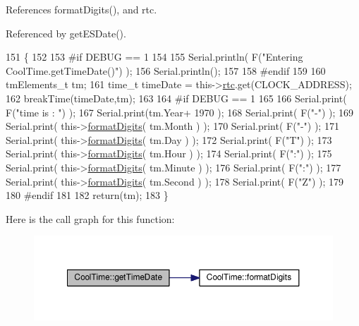 References format\+Digits(), and rtc.



Referenced by get\+E\+S\+Date().


\begin{DoxyCode}
151 \{
152 
153 \textcolor{preprocessor}{#if DEBUG == 1 }
154     
155     Serial.println( F(\textcolor{stringliteral}{"Entering CoolTime.getTimeDate()"}) );
156     Serial.println();
157 
158 \textcolor{preprocessor}{#endif}
159 
160     tmElements\_t tm;
161     time\_t timeDate = this->\hyperlink{classCoolTime_abd38f2384ff90692b1568d9db869412e}{rtc}.get(CLOCK\_ADDRESS);
162     breakTime(timeDate,tm);
163 
164 \textcolor{preprocessor}{#if DEBUG == 1}
165     
166     Serial.print( F(\textcolor{stringliteral}{"time is : "}) );
167     Serial.print(tm.Year+ 1970 );
168     Serial.print( F(\textcolor{stringliteral}{"-"}) );
169     Serial.print( this->\hyperlink{classCoolTime_acd537cd4210d7bde4e1f5c47d2ac0456}{formatDigits}( tm.Month ) );
170     Serial.print( F(\textcolor{stringliteral}{"-"}) );
171     Serial.print( this->\hyperlink{classCoolTime_acd537cd4210d7bde4e1f5c47d2ac0456}{formatDigits}( tm.Day ) );
172     Serial.print( F(\textcolor{stringliteral}{"T"}) );
173     Serial.print( this->\hyperlink{classCoolTime_acd537cd4210d7bde4e1f5c47d2ac0456}{formatDigits}( tm.Hour ) );
174     Serial.print( F(\textcolor{stringliteral}{":"}) );
175     Serial.print( this->\hyperlink{classCoolTime_acd537cd4210d7bde4e1f5c47d2ac0456}{formatDigits}( tm.Minute ) );
176     Serial.print( F(\textcolor{stringliteral}{":"}) );
177     Serial.print( this->\hyperlink{classCoolTime_acd537cd4210d7bde4e1f5c47d2ac0456}{formatDigits}( tm.Second ) );
178     Serial.print( F(\textcolor{stringliteral}{"Z"}) );
179 
180 \textcolor{preprocessor}{#endif}
181     
182     \textcolor{keywordflow}{return}(tm);
183 \}
\end{DoxyCode}
Here is the call graph for this function\+:\nopagebreak
\begin{figure}[H]
\begin{center}
\leavevmode
\includegraphics[width=350pt]{classCoolTime_a7a7501c5ca77dd1248bea704c44f986c_cgraph}
\end{center}
\end{figure}
